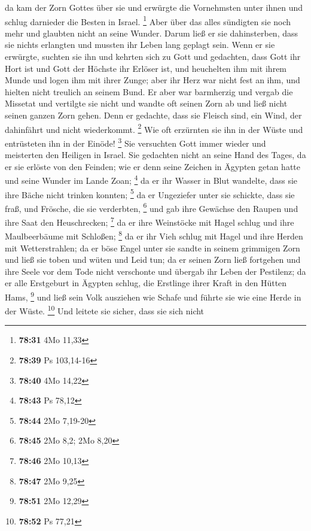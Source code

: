  da kam der Zorn Gottes über sie und erwürgte die
Vornehmsten unter ihnen und schlug darnieder die Besten in Israel.
\footnote{\textbf{78:31} 4Mo 11,33}  Aber über das alles
sündigten sie noch mehr und glaubten nicht an seine Wunder.
 Darum ließ er sie dahinsterben, dass sie nichts erlangten
und mussten ihr Leben lang geplagt sein.  Wenn er sie
erwürgte, suchten sie ihn und kehrten sich zu Gott  und
gedachten, dass Gott ihr Hort ist und Gott der Höchste ihr Erlöser ist,
 und heuchelten ihm mit ihrem Munde und logen ihm mit ihrer
Zunge;  aber ihr Herz war nicht fest an ihm, und hielten
nicht treulich an seinem Bund.  Er aber war barmherzig und
vergab die Missetat und vertilgte sie nicht und wandte oft seinen Zorn
ab und ließ nicht seinen ganzen Zorn gehen.  Denn er
gedachte, dass sie Fleisch sind, ein Wind, der dahinfährt und nicht
wiederkommt. \footnote{\textbf{78:39} Ps 103,14-16}  Wie
oft erzürnten sie ihn in der Wüste und entrüsteten ihn in der Einöde!
\footnote{\textbf{78:40} 4Mo 14,22}  Sie versuchten Gott
immer wieder und meisterten den Heiligen in Israel.  Sie
gedachten nicht an seine Hand des Tages, da er sie erlöste von den
Feinden;  wie er denn seine Zeichen in Ägypten getan hatte
und seine Wunder im Lande Zoan; \footnote{\textbf{78:43} Ps 78,12}
 da er ihr Wasser in Blut wandelte, dass sie ihre Bäche
nicht trinken konnten; \footnote{\textbf{78:44} 2Mo 7,19-20}
 da er Ungeziefer unter sie schickte, dass sie fraß, und
Frösche, die sie verderbten, \footnote{\textbf{78:45} 2Mo 8,2; 2Mo 8,20}
 und gab ihre Gewächse den Raupen und ihre Saat den
Heuschrecken; \footnote{\textbf{78:46} 2Mo 10,13}  da er
ihre Weinstöcke mit Hagel schlug und ihre Maulbeerbäume mit Schloßen;
\footnote{\textbf{78:47} 2Mo 9,25}  da er ihr Vieh schlug
mit Hagel und ihre Herden mit Wetterstrahlen;  da er böse
Engel unter sie sandte in seinem grimmigen Zorn und ließ sie toben und
wüten und Leid tun;  da er seinen Zorn ließ fortgehen und
ihre Seele vor dem Tode nicht verschonte und übergab ihr Leben der
Pestilenz;  da er alle Erstgeburt in Ägypten schlug, die
Erstlinge ihrer Kraft in den Hütten Hams, \footnote{\textbf{78:51} 2Mo
  12,29}  und ließ sein Volk ausziehen wie Schafe und
führte sie wie eine Herde in der Wüste. \footnote{\textbf{78:52} Ps
  77,21}  Und leitete sie sicher, dass sie sich nicht
